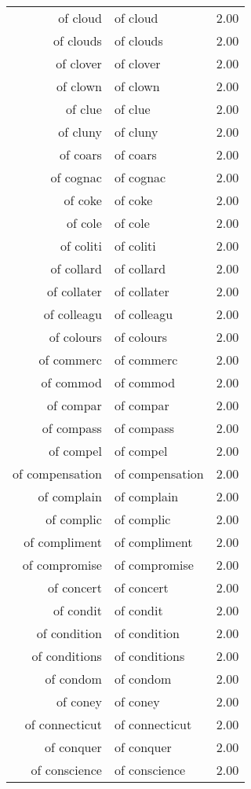\begin{table}[ht]
\begin{tabular}{rlr}
  of cloud & of cloud & 2.00 \\ 
  of clouds & of clouds & 2.00 \\ 
  of clover & of clover & 2.00 \\ 
  of clown & of clown & 2.00 \\ 
  of clue & of clue & 2.00 \\ 
  of cluny & of cluny & 2.00 \\ 
  of coars & of coars & 2.00 \\ 
  of cognac & of cognac & 2.00 \\ 
  of coke & of coke & 2.00 \\ 
  of cole & of cole & 2.00 \\ 
  of coliti & of coliti & 2.00 \\ 
  of collard & of collard & 2.00 \\ 
  of collater & of collater & 2.00 \\ 
  of colleagu & of colleagu & 2.00 \\ 
  of colours & of colours & 2.00 \\ 
  of commerc & of commerc & 2.00 \\ 
  of commod & of commod & 2.00 \\ 
  of compar & of compar & 2.00 \\ 
  of compass & of compass & 2.00 \\ 
  of compel & of compel & 2.00 \\ 
  of compensation & of compensation & 2.00 \\ 
  of complain & of complain & 2.00 \\ 
  of complic & of complic & 2.00 \\ 
  of compliment & of compliment & 2.00 \\ 
  of compromise & of compromise & 2.00 \\ 
  of concert & of concert & 2.00 \\ 
  of condit & of condit & 2.00 \\ 
  of condition & of condition & 2.00 \\ 
  of conditions & of conditions & 2.00 \\ 
  of condom & of condom & 2.00 \\ 
  of coney & of coney & 2.00 \\ 
  of connecticut & of connecticut & 2.00 \\ 
  of conquer & of conquer & 2.00 \\ 
  of conscience & of conscience & 2.00 \\ 

\end{tabular}
\end{table}
